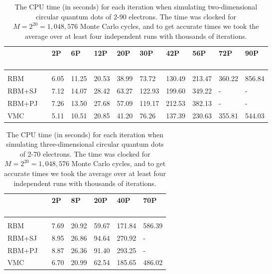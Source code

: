 \begin{table}[H]
	\caption{The CPU time (in seconds) for each iteration when simulating two-dimensional circular quantum dots of 2-90 electrons. The time was clocked for $M=2^{20}=1,048,576$ Monte Carlo cycles, and to get accurate times we took the average over at least four independent runs with thousands of iterations.}
	\label{tab:cputime2D}
	\begin{tabularx}{\textwidth}{lrR{1.1cm}R{1.1cm}R{1.1cm}R{1.1cm}R{1.1cm}R{1.1cm}R{1.1cm}R{1.1cm}R{1.1cm}} \hline\hline
		\makecell{\\ \phantom{=} \\ \phantom{=}} && 2P & 6P & 12P & 20P & 30P & 42P & 56P & 72P & 90P \\ \hline \\
		RBM && 6.05 & 11.25 & 20.53 & 38.99 & 73.72 & 130.49 & 213.47 & 360.22 & 856.84 \\
		RBM+SJ && 7.12 & 14.07 & 28.42 & 63.27 & 122.93 & 199.60 & 349.22 & - & - \\
		RBM+PJ && 7.26 & 13.50 & 27.68 & 57.09 & 119.17 & 212.53 & 382.13 & - & - \\
		VMC && 5.11 & 10.51 & 20.85 & 41.20 & 76.26 & 137.39 & 230.63 & 355.81 & 544.03 \\ \hline \hline
	\end{tabularx}
\end{table}

\begin{table}[H]
	\caption{The CPU time (in seconds) for each iteration when simulating three-dimensional circular quantum dots of 2-70 electrons. The time was clocked for $M=2^{20}=1,048,576$ Monte Carlo cycles, and to get accurate times we took the average over at least four independent runs with thousands of iterations.}
	\label{tab:cputime3D}
	\begin{tabularx}{\textwidth}{lrR{2.1cm}R{2.1cm}R{2.1cm}R{2.1cm}R{2.1cm}} \hline\hline
		\makecell{\\ \phantom{=} \\ \phantom{=}} && 2P & 8P & 20P & 40P & 70P \\ \hline \\
		RBM && 7.69 & 20.92 & 59.67 & 171.84 & 586.39 \\
		RBM+SJ && 8.95 & 26.86 & 94.64 & 270.92 & - \\
		RBM+PJ && 8.87 & 26.36 & 91.40 & 293.25 & - \\
		VMC && 6.70 & 20.99 & 62.54 & 185.65 & 486.02 \\ \hline \hline
	\end{tabularx}
\end{table}

